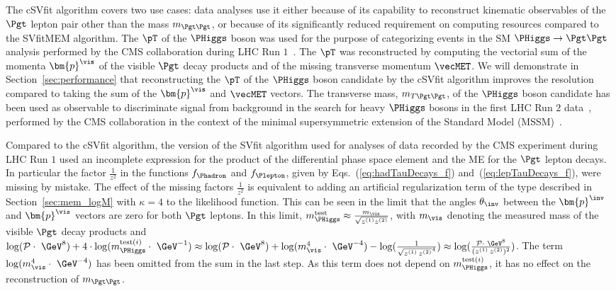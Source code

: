 The cSVfit algorithm covers two use cases:
data analyses use it either because of its capability to reconstruct kinematic observables of the $\Pgt$ lepton pair other than the mass $m_{\Pgt\Pgt}$,
or because of its significantly reduced requirement on computing resources compared to the SVfitMEM algorithm.
The $\pT$ of the $\PHiggs$ boson was used for the purpose of categorizing events in the SM $\PHiggs \to \Pgt\Pgt$ analysis 
performed by the CMS collaboration during LHC Run $1$~\cite{HIG-13-004}.
The $\pT$ was reconstructed by computing the vectorial sum of the momenta $\bm{p}^{\vis}$ of the visible $\Pgt$ decay products and of the missing transverse momentum $\vecMET$.
We will demonstrate in Section~\ref{sec:performance} that reconstructing the $\pT$ of the $\PHiggs$ boson candidate by the cSVfit algorithm
improves the resolution compared to taking the sum of the $\bm{p}^{\vis}$ and $\vecMET$ vectors.
The transverse mass, $m_{T\Pgt\Pgt}$, of the $\PHiggs$ boson candidate has been used as observable to discriminate signal from background
in the search for heavy $\PHiggs$ bosons in the first LHC Run $2$ data~\cite{HIG-16-006}, 
performed by the CMS collaboration in the context of the minimal supersymmetric extension of the Standard Model (MSSM)~\cite{Fayet:1974pd,Fayet:1977yc}.

Compared to the cSVfit algorithm,
the version of the SVfit algorithm used for analyses of data recorded by the CMS experiment during LHC Run $1$
used an incomplete expression for the product of the differential phase space element and the ME for the $\Pgt$ lepton decays.
In particular the factor $\frac{1}{z^{2}}$ in the functions $f_{\Phadron}$ and $f_{\Plepton}$, 
given by Eqs.~(\ref{eq:hadTauDecays_f}) and~(\ref{eq:lepTauDecays_f}), were missing by mistake.
The effect of the missing factors $\frac{1}{z^{2}}$ 
is equivalent to adding an artificial regularization term of the type described in Section~\ref{sec:mem_logM} with $\kappa = 4$ to the likelihood function.
This can be seen in the limit that the angles $\theta_{\inv}$ between the $\bm{p}^{\inv}$ and $\bm{p}^{\vis}$ vectors are zero for both $\Pgt$ leptons.
In this limit, $m_{\PHiggs}^{\textrm{test}} \approx \frac{m_{\vis}}{\sqrt{z^{(1)}z^{(2)}}}$,
with $m_{\vis}$ denoting the measured mass of the visible $\Pgt$ decay products
and $\log(\mathcal{P} \cdot \textrm{~\GeV}^{8}) + 4 \cdot \log(m_{\PHiggs}^{\textrm{test}(i)} \cdot \textrm{~\GeV}^{-1}) \approx \log(\mathcal{P} \cdot \textrm{~\GeV}^{8}) + \log(m_{\vis}^{4} \cdot \textrm{~\GeV}^{-4}) - \log(\frac{1}{\sqrt{z^{(1)} \, z^{(2)}}^{4}}) \approx \log(\frac{\mathcal{P} \cdot \textrm{~\GeV}^{8}}{(z^{(1)} \, z^{(2)})^{2}})$.
The term $\log(m_{\vis}^{4} \cdot \textrm{~\GeV}^{-4})$ has been omitted from the sum in the last step.
As this term does not depend on $m_{\PHiggs}^{\textrm{test}(i)}$,
it has no effect on the reconstruction of $m_{\Pgt\Pgt}$.
